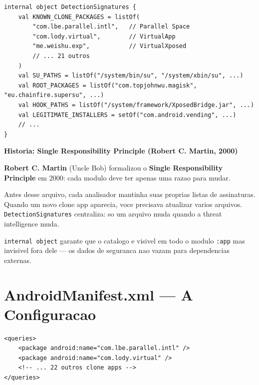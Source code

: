 \documentclass[12pt,a4paper]{article}
\begin{document}
\begin{lstlisting}
internal object DetectionSignatures {
    val KNOWN_CLONE_PACKAGES = listOf(
        "com.lbe.parallel.intl",   // Parallel Space
        "com.lody.virtual",        // VirtualApp
        "me.weishu.exp",           // VirtualXposed
        // ... 21 outros
    )
    val SU_PATHS = listOf("/system/bin/su", "/system/xbin/su", ...)
    val ROOT_PACKAGES = listOf("com.topjohnwu.magisk", "eu.chainfire.supersu", ...)
    val HOOK_PATHS = listOf("/system/framework/XposedBridge.jar", ...)
    val LEGITIMATE_INSTALLERS = setOf("com.android.vending", ...)
    // ...
}
\end{lstlisting}

\begin{historybox}
\textbf{Historia: Single Responsibility Principle (Robert C. Martin, 2000)}

\textbf{Robert C. Martin} (Uncle Bob) formalizou o \textbf{Single Responsibility
Principle} em 2000: cada modulo deve ter apenas uma razao para mudar.

Antes desse arquivo, cada analisador mantinha suas proprias listas de
assinaturas. Quando um novo clone app aparecia, voce precisava atualizar
varios arquivos. \texttt{DetectionSignatures} centraliza: so um arquivo
muda quando a threat intelligence muda.

\texttt{internal object} garante que o catalogo e visivel em todo o modulo
\texttt{:app} mas invisivel fora dele --- os dados de seguranca nao vazam
para dependencias externas.
\end{historybox}

\newpage

\section{AndroidManifest.xml --- A Configuracao}

\begin{lstlisting}
<queries>
    <package android:name="com.lbe.parallel.intl" />
    <package android:name="com.lody.virtual" />
    <!-- ... 22 outros clone apps -->
</queries>
\end{lstlisting}
\end{document}
